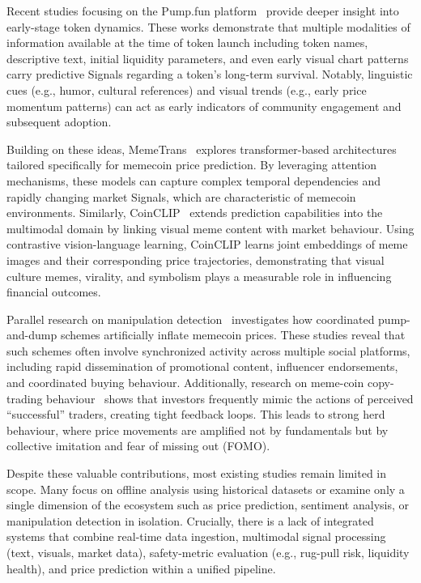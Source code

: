 \documentclass[12pt,a4paper,oneside,openany]{book}
\begin{document}
Recent studies focusing on the Pump.fun platform~\cite{ref10} provide deeper insight into early-stage token dynamics. These works demonstrate that multiple modalities of information available at the time of token launch including token names, descriptive text, initial liquidity parameters, and even early visual chart patterns carry predictive Signals regarding a token’s long-term survival. Notably, linguistic cues (e.g., humor, cultural references) and visual trends (e.g., early price momentum patterns) can act as early indicators of community engagement and subsequent adoption.

Building on these ideas, MemeTrans~\cite{ref11} explores transformer-based architectures tailored specifically for memecoin price prediction. By leveraging attention mechanisms, these models can capture complex temporal dependencies and rapidly changing market Signals, which are characteristic of memecoin environments. Similarly, CoinCLIP~\cite{ref33} extends prediction capabilities into the multimodal domain by linking visual meme content with market behaviour. Using contrastive vision-language learning, CoinCLIP learns joint embeddings of meme images and their corresponding price trajectories, demonstrating that visual culture memes, virality, and symbolism plays a measurable role in influencing financial outcomes.

Parallel research on manipulation detection~\cite{ref34} investigates how coordinated pump-and-dump schemes artificially inflate memecoin prices. These studies reveal that such schemes often involve synchronized activity across multiple social platforms, including rapid dissemination of promotional content, influencer endorsements, and coordinated buying behaviour. Additionally, research on meme-coin copy-trading behaviour~\cite{ref35} shows that investors frequently mimic the actions of perceived “successful” traders, creating tight feedback loops. This leads to strong herd behaviour, where price movements are amplified not by fundamentals but by collective imitation and fear of missing out (FOMO).

Despite these valuable contributions, most existing studies remain limited in scope. Many focus on offline analysis using historical datasets or examine only a single dimension of the ecosystem such as price prediction, sentiment analysis, or manipulation detection in isolation. Crucially, there is a lack of integrated systems that combine real-time data ingestion, multimodal signal processing (text, visuals, market data), safety-metric evaluation (e.g., rug-pull risk, liquidity health), and price prediction within a unified pipeline.
\end{document}
